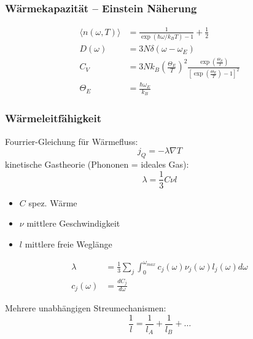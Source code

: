 \subsubsection*{Wärmekapazität – Einstein Näherung}
\begin{equation*}
    \begin{aligned}
        \langle n(\omega,T) \rangle &= \frac{1}{\exp(\hbar \omega / k_B T) -1} + \frac{1}{2}\\
        D(\omega) &= 3N \delta(\omega-\omega_E) \\
        C_V &= 3N k_B \left(\frac{\Theta_E}{T}\right)^2 \frac{\exp\left(\frac{\Theta_E}{T}\right)}{\left[\exp \left(\frac{\Theta_E}{T}\right)-1\right]^2} \\
        \Theta_E &= \frac{\hbar \omega_E}{k_B}
    \end{aligned}
\end{equation*}

\subsubsection*{Wärmeleitfähigkeit}
Fourrier-Gleichung für Wärmefluss:
\begin{equation*}
    j_Q = - \lambda \nabla T
\end{equation*}
kinetische Gastheorie (Phononen = ideales Gas):
\begin{equation*}
    \lambda = \frac{1}{3} C \nu l
\end{equation*}

\begin{itemize}
    \itemsep 0pt
    \item $C$ spez. Wärme
    \item $\nu$ mittlere Geschwindigkeit 
    \item $l$ mittlere freie Weglänge
\end{itemize}

\begin{equation*}
    \begin{aligned}
        \lambda &= \frac{1}{3} \sum_j \int_0^{\omega_{max}} c_j(\omega) \nu_j(\omega) l_j(\omega) d\omega \\
        c_j(\omega) &= \frac{dC_j}{d\omega}
    \end{aligned}
\end{equation*}

Mehrere unabhängigen Streumechanismen:
\begin{equation*}
    \frac{1}{l} = \frac{1}{l_A} + \frac{1}{l_B} + \dots
\end{equation*}